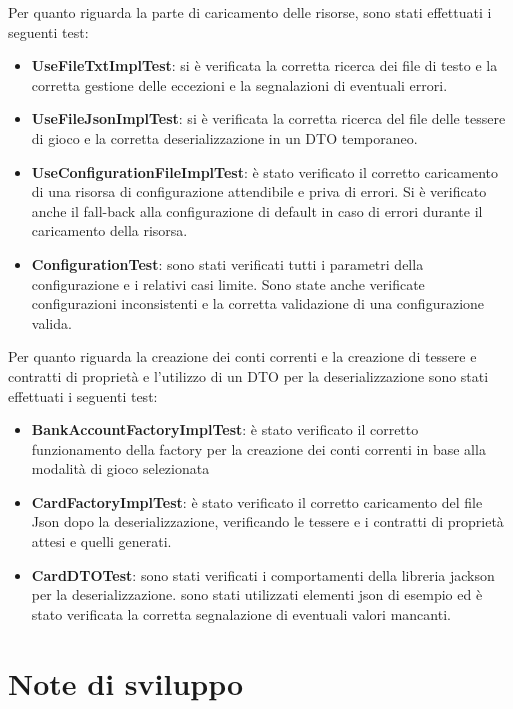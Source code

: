 Per quanto riguarda la parte di caricamento delle risorse, sono stati effettuati i seguenti test:\newline
\begin{itemize}
    \item \textbf{UseFileTxtImplTest}: si è verificata la corretta ricerca dei file di testo e la corretta gestione delle eccezioni e la segnalazioni di eventuali errori.
    \item \textbf{UseFileJsonImplTest}: si è verificata la corretta ricerca del file delle tessere di gioco e la corretta deserializzazione in un DTO temporaneo.
    \item \textbf{UseConfigurationFileImplTest}: è stato verificato il corretto caricamento di una risorsa di configurazione attendibile e priva di errori. Si è verificato anche il fall-back alla configurazione di default in caso di errori durante il caricamento della risorsa.
    \item \textbf{ConfigurationTest}: sono stati verificati tutti i parametri della configurazione e i relativi casi limite. Sono state anche verificate configurazioni inconsistenti e la corretta validazione di una configurazione valida.
\end{itemize}
Per quanto riguarda la creazione dei conti correnti e la creazione di tessere e contratti di proprietà e l'utilizzo di un DTO per la deserializzazione sono stati effettuati i seguenti test:\newline
\begin{itemize}
    \item \textbf{BankAccountFactoryImplTest}: è stato verificato il corretto funzionamento della factory per la creazione dei conti correnti in base alla modalità di gioco selezionata
    \item \textbf{CardFactoryImplTest}: è stato verificato il corretto caricamento del file Json dopo la deserializzazione, verificando le tessere e i contratti di proprietà attesi e quelli generati.
    \item \textbf{CardDTOTest}: sono stati verificati i comportamenti della libreria jackson per la deserializzazione. sono stati utilizzati elementi json di esempio ed è stato verificata la corretta segnalazione di eventuali valori mancanti.
\end{itemize}
\section{Note di sviluppo}